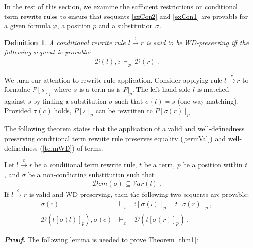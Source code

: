 \documentclass[copyright]{eptcs}
\newtheorem{definition}[theorem]{Definition}
\begin{document}
In the rest of this section, we examine the sufficient restrictions on conditional term rewrite rules to ensure that sequents \ref{exCon2} and \ref{exCon1} are provable for a given formula $\varphi$, a position $p$ and a substitution $\sigma$.

\begin{definition}\label{wdRewPres}
A conditional rewrite rule $l \xrightarrow{c} r$ is said to be WD-preserving iff the following sequent is provable:
\begin{eqnarray*}
\mathcal{D}(l), c~\vdash_{_\mathcal{D}}~\mathcal{D}(r)~.
\end{eqnarray*}
\end{definition}

We turn our attention to rewrite rule application. Consider applying rule $l \xrightarrow{c} r$ to formulae $P[s]_p$ where $s$ is a term as is $P|_p$. The left hand side $l$ is matched against $s$ by finding a substitution $\sigma$ such that $\sigma(l)=s$ (one-way matching). Provided $\sigma(c)$ holds,  $P[s]_p$ can be rewritten to $P[\sigma(r)]_p$. 
\par
The following theorem states that the application of a valid and well-definedness preserving conditional term rewrite rule preserves equality (\ref{termVal}) and well-definedness (\ref{termWD}) of terms.
\begin{theorem}\label{thm1}
Let $l \xrightarrow{c} r$ be a conditional term rewrite rule, $t$ be a term, $p$ be a position within $t$, and $\sigma$ be a non-conflicting substitution such that
\begin{eqnarray*}
\mathcal{D}om(\sigma)\subseteq \mathcal{V}ar(l)~.
\end{eqnarray*}
If $l \xrightarrow{c} r$ is valid and WD-preserving, then the following two sequents are provable:
\begin{eqnarray}
\sigma(c)&~\vdash_{_\mathcal{D}}~&t[\sigma(l)]_p = t[\sigma(r)]_p~, \label{termVal}\\
\mathcal{D}(t[\sigma(l)]_p), \sigma(c)&~\vdash_{_\mathcal{D}}~&\mathcal{D}(t[\sigma(r)]_p)~\label{termWD}.
\end{eqnarray}
\end{theorem}
\noindent \textbf{\textit{Proof}. } The following lemma is needed to prove Theorem \ref{thm1}:
\end{document}
